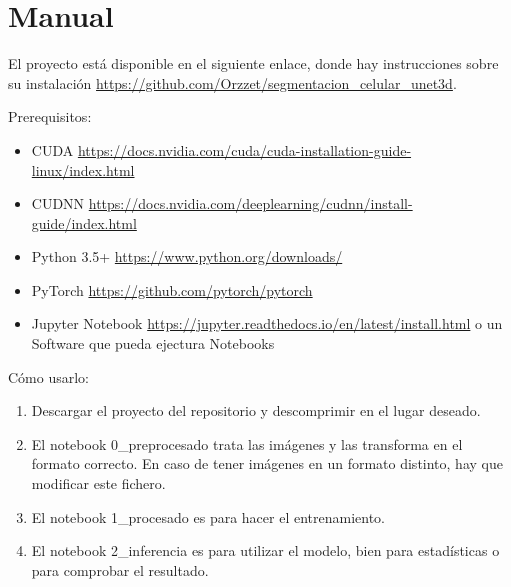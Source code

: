 \chapter{Manual}\label{manual}

El proyecto está disponible en el siguiente enlace, donde hay instrucciones sobre su instalación \url{https://github.com/Orzzet/segmentacion_celular_unet3d}.

Prerequisitos:
\begin{itemize}
\item CUDA \url{https://docs.nvidia.com/cuda/cuda-installation-guide-linux/index.html}
\item CUDNN \url{https://docs.nvidia.com/deeplearning/cudnn/install-guide/index.html}
\item Python 3.5+ \url{https://www.python.org/downloads/}
\item PyTorch \url{https://github.com/pytorch/pytorch}
\item Jupyter Notebook \url{https://jupyter.readthedocs.io/en/latest/install.html} o un Software que pueda ejectura Notebooks
\end{itemize}

Cómo usarlo:
\begin{enumerate}
\item Descargar el proyecto del repositorio y descomprimir en el lugar deseado.
\item El notebook 0\_preprocesado trata las imágenes y las transforma en el formato correcto. En caso de tener imágenes en un formato distinto, hay que modificar este fichero.
\item El notebook 1\_procesado es para hacer el entrenamiento.
\item El notebook 2\_inferencia es para utilizar el modelo, bien para estadísticas o para comprobar el resultado.
\end{enumerate}


